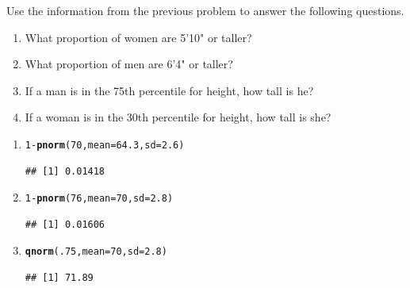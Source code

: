 \documentclass[twoside]{book}\usepackage[]{graphicx}\usepackage[]{xcolor}
\makeatletter
\newcommand{\hlnum}[1]{\textcolor[rgb]{0.686,0.059,0.569}{#1}}%
\newcommand{\hlopt}[1]{\textcolor[rgb]{0,0,0}{#1}}%
\newcommand{\hlstd}[1]{\textcolor[rgb]{0.345,0.345,0.345}{#1}}%
\newcommand{\hlkwc}[1]{\textcolor[rgb]{0.333,0.667,0.333}{#1}}%
\newcommand{\hlkwd}[1]{\textcolor[rgb]{0.737,0.353,0.396}{\textbf{#1}}}%
\newenvironment{kframe}{%
 \def\at@end@of@kframe{}%
 \ifinner\ifhmode%
  \def\at@end@of@kframe{\end{minipage}}%
  \begin{minipage}{\columnwidth}%
 \fi\fi%
 \def\FrameCommand##1{\hskip\@totalleftmargin \hskip-\fboxsep
 \colorbox{shadecolor}{##1}\hskip-\fboxsep
     \hskip-\linewidth \hskip-\@totalleftmargin \hskip\columnwidth}%
 \MakeFramed {\advance\hsize-\width
   \@totalleftmargin\z@ \linewidth\hsize
   \@setminipage}}%
 {\par\unskip\endMakeFramed%
 \at@end@of@kframe}
\newenvironment{knitrout}{}{} %
\makeatother
\begin{document}
\begin{problem}
	Use the information from the previous problem to answer the following questions.
	\begin{enumerate}
		\item
			What proportion of women are 5'10" or taller?
		\item
			What proportion of men are 6'4" or taller?
		\item
			If a man is in the 75th percentile for height, how tall is he?
		\item
			If a woman is in the 30th percentile for height, how tall is she?
	\end{enumerate}
\end{problem}

\begin{solution}
\begin{enumerate}
\item
\begin{knitrout}
\color{fgcolor}\begin{kframe}
\begin{alltt}
\hlnum{1} \hlopt{-} \hlkwd{pnorm}\hlstd{(}\hlnum{70}\hlstd{,} \hlkwc{mean} \hlstd{=} \hlnum{64.3}\hlstd{,} \hlkwc{sd} \hlstd{=} \hlnum{2.6}\hlstd{)}
\end{alltt}
\begin{verbatim}
## [1] 0.01418
\end{verbatim}
\end{kframe}
\end{knitrout}

\item
\begin{knitrout}
\color{fgcolor}\begin{kframe}
\begin{alltt}
\hlnum{1} \hlopt{-} \hlkwd{pnorm}\hlstd{(}\hlnum{76}\hlstd{,} \hlkwc{mean} \hlstd{=} \hlnum{70}\hlstd{,} \hlkwc{sd} \hlstd{=} \hlnum{2.8}\hlstd{)}
\end{alltt}
\begin{verbatim}
## [1] 0.01606
\end{verbatim}
\end{kframe}
\end{knitrout}

\item
\begin{knitrout}
\color{fgcolor}\begin{kframe}
\begin{alltt}
\hlkwd{qnorm}\hlstd{(}\hlnum{.75}\hlstd{,} \hlkwc{mean} \hlstd{=} \hlnum{70}\hlstd{,} \hlkwc{sd} \hlstd{=} \hlnum{2.8}\hlstd{)}
\end{alltt}
\begin{verbatim}
## [1] 71.89
\end{verbatim}
\end{kframe}
\end{knitrout}


\end{enumerate}
\end{solution}
\end{document}
